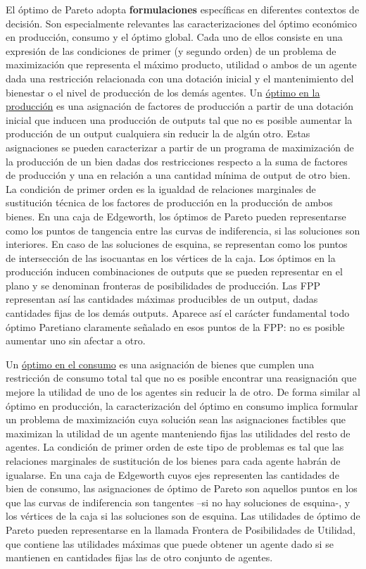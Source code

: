 \documentclass{nuevotema}
\begin{document}
El óptimo de Pareto adopta \textbf{formulaciones} específicas en diferentes contextos de decisión. Son especialmente relevantes las caracterizaciones del óptimo económico en producción, consumo y el óptimo global. Cada uno de ellos consiste en una expresión de las condiciones de primer (y segundo orden) de un problema de maximización que representa el máximo producto, utilidad o ambos de un agente dada una restricción relacionada con una dotación inicial y el mantenimiento del bienestar o el nivel de producción de los demás agentes. Un \underline{óptimo en la producción} es una asignación de factores de producción a partir de una dotación inicial que inducen una producción de outputs tal que no es posible aumentar la producción de un output cualquiera sin reducir la de algún otro. Estas asignaciones se pueden caracterizar a partir de un programa de maximización de la producción de un bien dadas dos restricciones respecto a la suma de factores de producción y una en relación a una cantidad mínima de output de otro bien. La condición de primer orden es la igualdad de relaciones marginales de sustitución técnica de los factores de producción en la producción de ambos bienes. En una caja de Edgeworth, los óptimos de Pareto pueden representarse como los puntos de tangencia entre las curvas de indiferencia, si las soluciones son interiores. En caso de las soluciones de esquina, se representan como los puntos de intersección de las isocuantas en los vértices de la caja. Los óptimos en la producción inducen combinaciones de outputs que se pueden representar en el plano y se denominan fronteras de posibilidades de producción. Las FPP representan así las cantidades máximas producibles de un output, dadas cantidades fijas de los demás outputs. Aparece así el carácter fundamental todo óptimo Paretiano claramente señalado en esos puntos de la FPP: no es posible aumentar uno sin afectar a otro.

Un \underline{óptimo en el consumo} es una asignación de bienes que cumplen una restricción de consumo total tal que no es posible encontrar una reasignación que mejore la utilidad de uno de los agentes sin reducir la de otro. De forma similar al óptimo en producción, la caracterización del óptimo en consumo implica formular un problema de maximización cuya solución sean las asignaciones factibles que maximizan la utilidad de un agente manteniendo fijas las utilidades del resto de agentes. La condición de primer orden de este tipo de problemas es tal que las relaciones marginales de sustitución de los bienes para cada agente habrán de igualarse. En una caja de Edgeworth cuyos ejes representen las cantidades de bien de consumo, las asignaciones de óptimo de Pareto son aquellos puntos en los que las curvas de indiferencia son tangentes --si no hay soluciones de esquina-, y los vértices de la caja si las soluciones son de esquina. Las utilidades de óptimo de Pareto pueden representarse en la llamada Frontera de Posibilidades de Utilidad, que contiene las utilidades máximas que puede obtener un agente dado si se mantienen en cantidades fijas las de otro conjunto de agentes. 
\end{document}
